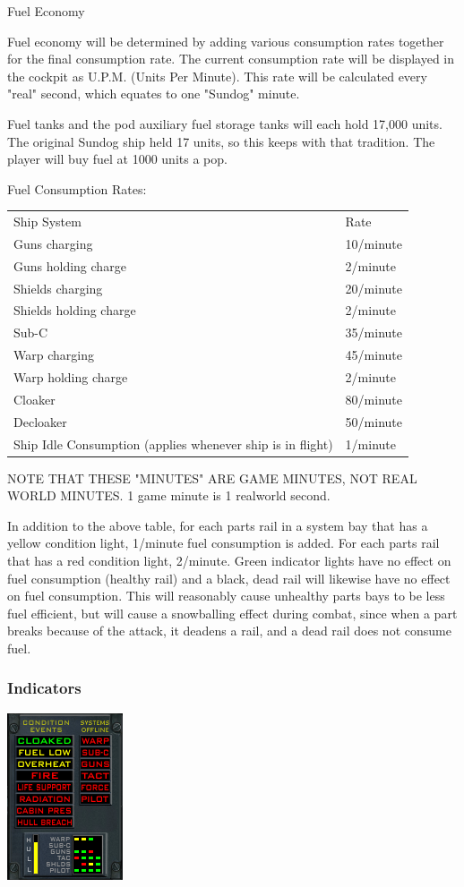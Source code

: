 \begin{itemize}
Fuel Economy

Fuel economy will be determined by adding various consumption rates together for the final consumption rate. The current consumption rate will be displayed in the cockpit as U.P.M. (Units Per Minute). This rate will be calculated every "real" second, which equates to one "Sundog" minute. 

Fuel tanks and the pod auxiliary fuel storage tanks will each hold 17,000 units.  The original Sundog ship held 17 units, so this keeps with that tradition. The player will buy fuel at 1000 units a pop.

Fuel Consumption Rates:

\begin{tabular}{ | l | l | }
\hline
Ship System & Rate \\
Guns charging & 10\slash minute \\
Guns holding charge & 2\slash minute \\
Shields charging & 20\slash minute \\
Shields holding charge & 2\slash minute \\
Sub-C & 35\slash minute \\
Warp charging & 45\slash minute \\
Warp holding charge & 2\slash minute \\
Cloaker & 80\slash minute \\
Decloaker & 50\slash minute \\
Ship Idle Consumption (applies whenever ship is in flight) & 1\slash minute \\
\hline
\end{tabular}

NOTE THAT THESE "MINUTES" ARE GAME MINUTES, NOT REAL WORLD MINUTES. 1 game minute is 1 realworld second. 

In addition to the above table, for each parts rail in a system bay that has a yellow condition light, 1\slash minute fuel consumption is added. For each parts rail that has a red condition light, 2\slash minute. Green indicator lights have no effect on fuel consumption (healthy rail) and a black, dead rail will likewise have no effect on fuel consumption. This will reasonably cause unhealthy parts bays to be less fuel efficient, but will cause a snowballing effect during combat, since when a part breaks because of the attack, it deadens a rail, and a dead rail does not consume fuel. 



\subsubsection{Indicators}
\includegraphics[scale=0.70]{images/indicators.png}


\end{itemize}
